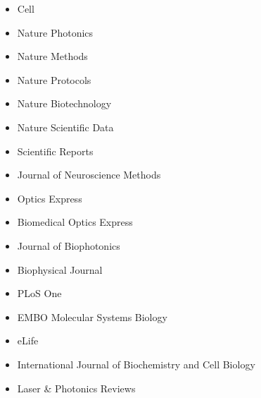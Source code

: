 \begin{itemize}
\item Cell
\item Nature Photonics
\item Nature Methods
\item Nature Protocols
\item Nature Biotechnology
\item Nature Scientific Data
\item Scientific Reports
\item Journal of Neuroscience Methods
\item Optics Express
\item Biomedical Optics Express
\item Journal of Biophotonics
\item Biophysical Journal
\item PLoS One
\item EMBO Molecular Systems Biology 
\item eLife
\item International Journal of Biochemistry and Cell Biology
\item Laser \& Photonics Reviews
\end{itemize}